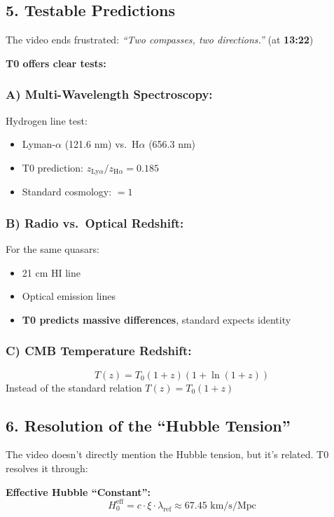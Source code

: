 \documentclass{article}
\begin{document}
	\subsection{5. Testable Predictions}
	
	The video ends frustrated: \textit{``Two compasses, two directions.''} (at \textbf{13:22})
	
	\textbf{T0 offers clear tests:}
	
	\subsubsection{A) Multi-Wavelength Spectroscopy:}
	
	Hydrogen line test:
	\begin{itemize}
		\item Lyman-$\alpha$ (121.6 nm) vs.\ H$\alpha$ (656.3 nm)
		\item T0 prediction: $z_{\mathrm{Ly}\alpha} / z_{\mathrm{H}\alpha} = 0.185$
		\item Standard cosmology: $= 1$
	\end{itemize}
	
	\subsubsection{B) Radio vs.\ Optical Redshift:}
	For the same quasars:
	\begin{itemize}
		\item 21 cm HI line
		\item Optical emission lines
		\item \textbf{T0 predicts massive differences}, standard expects identity
	\end{itemize}
	
	\subsubsection{C) CMB Temperature Redshift:}
	$$T(z) = T_0(1+z)(1+\ln(1+z))$$
	Instead of the standard relation $T(z) = T_0(1+z)$
	
	\subsection{6. Resolution of the ``Hubble Tension''}
	
	The video doesn't directly mention the Hubble tension, but it's related. T0 resolves it through:
	
	\textbf{Effective Hubble ``Constant'':}
	$$H_0^{\text{eff}} = c \cdot \xi \cdot \lambda_{\text{ref}} \approx 67.45 \text{ km/s/Mpc}$$
	
\end{document}
